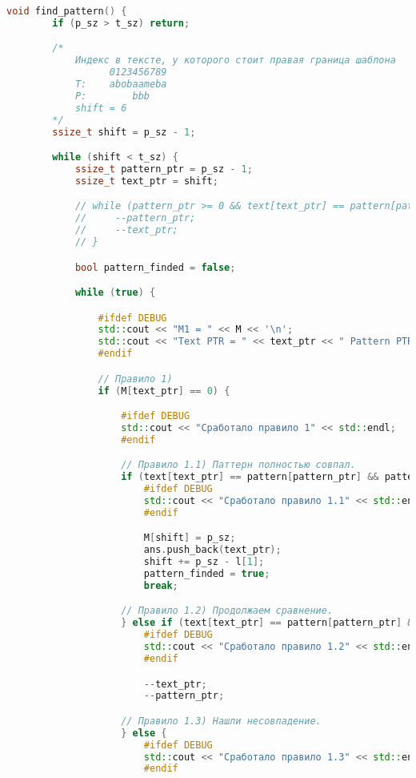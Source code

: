 \begin{lstlisting}[language=C++]
    void find_pattern() {
        if (p_sz > t_sz) return;

        /*
            Индекс в тексте, у которого стоит правая граница шаблона
                  0123456789
            T:    abobaameba
            P:        bbb
            shift = 6
        */ 
        ssize_t shift = p_sz - 1;

        while (shift < t_sz) {
            ssize_t pattern_ptr = p_sz - 1;
            ssize_t text_ptr = shift;

            // while (pattern_ptr >= 0 && text[text_ptr] == pattern[pattern_ptr]) {
            //     --pattern_ptr;
            //     --text_ptr;
            // }

            bool pattern_finded = false;

            while (true) {

                #ifdef DEBUG
                std::cout << "M1 = " << M << '\n';
                std::cout << "Text PTR = " << text_ptr << " Pattern PTR = " << pattern_ptr << std::endl;
                #endif

                // Правило 1)
                if (M[text_ptr] == 0) {

                    #ifdef DEBUG
                    std::cout << "Сработало правило 1" << std::endl;
                    #endif

                    // Правило 1.1) Паттерн полностью совпал.
                    if (text[text_ptr] == pattern[pattern_ptr] && pattern_ptr == 0) {
                        #ifdef DEBUG
                        std::cout << "Сработало правило 1.1" << std::endl;
                        #endif

                        M[shift] = p_sz;
                        ans.push_back(text_ptr);
                        shift += p_sz - l[1];
                        pattern_finded = true;
                        break;

                    // Правило 1.2) Продолжаем сравнение.
                    } else if (text[text_ptr] == pattern[pattern_ptr] && pattern_ptr > 0) {
                        #ifdef DEBUG
                        std::cout << "Сработало правило 1.2" << std::endl;
                        #endif

                        --text_ptr;
                        --pattern_ptr;

                    // Правило 1.3) Нашли несовпадение.
                    } else {
                        #ifdef DEBUG
                        std::cout << "Сработало правило 1.3" << std::endl;
                        #endif


\end{lstlisting}
